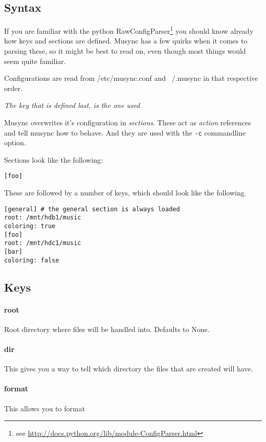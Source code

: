 \subsection{Syntax}
If you are familiar with the python RawConfigParser\footnote{see \url{http://docs.python.org/lib/module-ConfigParser.html}} you should know already how keys and sections are defined.
Musync has a few quirks when it comes to parsing these, so it might be best to read on, even though most things would seem quite familiar.

Configurations are read from /etc/musync.conf and ~/.musync in that respective order.

\emph{The key that is defined last, is the one used}

Musync overwrites it's configuration in \emph{sections}.
These act as \emph{action} references and tell musync how to behave.
And they are used with the \verb!-c! commandline option.

Sections look like the following:

\begin{verbatim}
[foo]
\end{verbatim}

These are followed by a number of keys, which should look like the following.

\begin{verbatim}
[general] # the general section is always loaded
root: /mnt/hdb1/music
coloring: true
[foo]
root: /mnt/hdc1/music
[bar]
coloring: false
\end{verbatim}

\subsection{Keys}
\paragraph{root}
Root directory where files will be handled into. Defaults to None. 

\paragraph{dir}
This gives you a way to tell which directory the files that are created will have. 

\paragraph{format}
This allows you to format 


